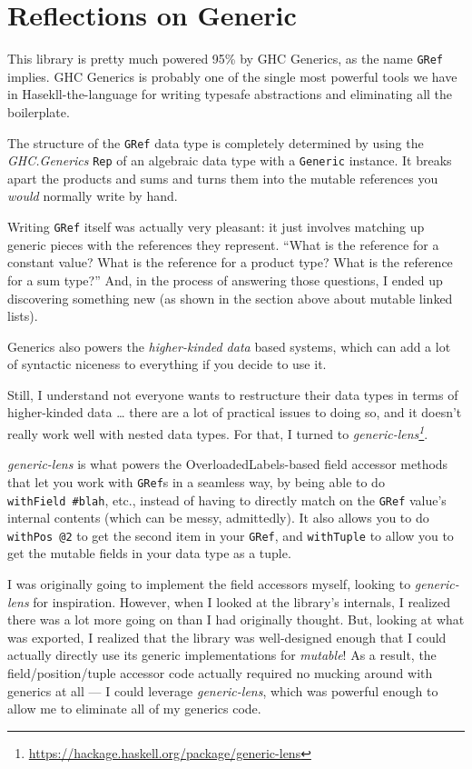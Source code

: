 \documentclass[]{article}
\renewcommand{\href}[2]{#2\footnote{\url{#1}}}
\begin{document}
\hypertarget{reflections-on-generic}{%
\section{Reflections on Generic}\label{reflections-on-generic}}

This library is pretty much powered 95\% by GHC Generics, as the name
\texttt{GRef} implies. GHC Generics is probably one of the single most powerful
tools we have in Hasekll-the-language for writing typesafe abstractions and
eliminating all the boilerplate.

The structure of the \texttt{GRef} data type is completely determined by using
the \emph{GHC.Generics} \texttt{Rep} of an algebraic data type with a
\texttt{Generic} instance. It breaks apart the products and sums and turns them
into the mutable references you \emph{would} normally write by hand.

Writing \texttt{GRef} itself was actually very pleasant: it just involves
matching up generic pieces with the references they represent. ``What is the
reference for a constant value? What is the reference for a product type? What
is the reference for a sum type?'' And, in the process of answering those
questions, I ended up discovering something new (as shown in the section above
about mutable linked lists).

Generics also powers the \emph{higher-kinded data} based systems, which can add
a lot of syntactic niceness to everything if you decide to use it.

Still, I understand not everyone wants to restructure their data types in terms
of higher-kinded data \ldots{} there are a lot of practical issues to doing so,
and it doesn't really work well with nested data types. For that, I turned to
\emph{\href{https://hackage.haskell.org/package/generic-lens}{generic-lens}}.

\emph{generic-lens} is what powers the OverloadedLabels-based field accessor
methods that let you work with \texttt{GRef}s in a seamless way, by being able
to do \texttt{withField\ \#blah}, etc., instead of having to directly match on
the \texttt{GRef} value's internal contents (which can be messy, admittedly). It
also allows you to do \texttt{withPos\ @2} to get the second item in your
\texttt{GRef}, and \texttt{withTuple} to allow you to get the mutable fields in
your data type as a tuple.

I was originally going to implement the field accessors myself, looking to
\emph{generic-lens} for inspiration. However, when I looked at the library's
internals, I realized there was a lot more going on than I had originally
thought. But, looking at what was exported, I realized that the library was
well-designed enough that I could actually directly use its generic
implementations for \emph{mutable}! As a result, the field/position/tuple
accessor code actually required no mucking around with generics at all --- I
could leverage \emph{generic-lens}, which was powerful enough to allow me to
eliminate all of my generics code.
\end{document}

